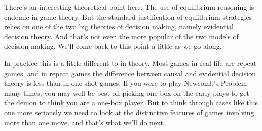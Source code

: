 There's an interesting theoretical point here. The use of equilibrium reasoning is endemic in game theory. But the standard justification of equiilbrium strategies relies on one of the two big theories of decision making, namely evidential decision theory. And that's not even the more popular of the two models of decision making. We'll come back to this point a little as we go along.

In practice this is a little different to in theory. Most games in real-life are repeat games, and in repeat games the difference between causal and evidential decision theory is less than in one-shot games. If you were to play Newcomb's Problem many times, you may well be best off picking one-box on the early plays to get the demon to think you are a one-box player. But to think through cases like this one more seriously we need to look at the distinctive features of games involving more than one move, and that's what we'll do next.
